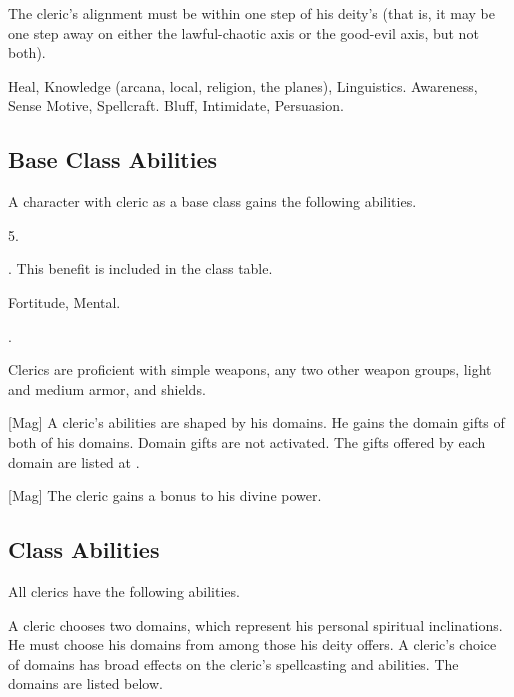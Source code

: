      The cleric's alignment must be within one step of his deity's (that is, it may be one step away on either the lawful-chaotic axis or the good-evil axis, but not both).

     Heal, Knowledge (arcana, local, religion, the planes), Linguistics.
     Awareness, Sense Motive, Spellcraft.
     Bluff, Intimidate, Persuasion.

    \subsection{Base Class Abilities}
        A character with cleric as a base class gains the following abilities.

         5.

         . This benefit is included in the class table.

          Fortitude,  Mental.

         .

        Clerics are proficient with simple weapons, any two other weapon groups, light and medium armor, and shields.

        [Mag]
        A cleric's abilities are shaped by his domains.
        He gains the domain gifts of both of his domains.
        Domain gifts are not activated.
        The gifts offered by each domain are listed at .

        [Mag]
        The cleric gains a  bonus to his divine power.

    \subsection{Class Abilities}
        All clerics have the following abilities.

        A cleric chooses two domains, which represent his personal spiritual inclinations.
        He must choose his domains from among those his deity offers.
        A cleric's choice of domains has broad effects on the cleric's spellcasting and abilities.
        The domains are listed below.

